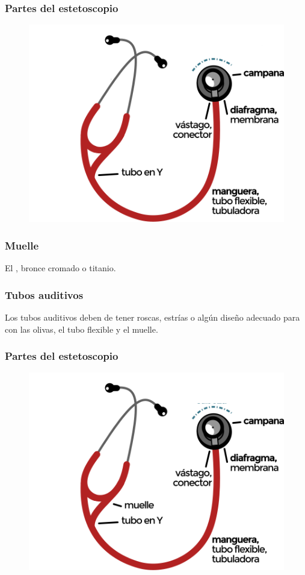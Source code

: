 \documentclass[14pt]{beamer}
\begin{document}
\begin{frame}
\frametitle{Partes del estetoscopio}
\vspace*{-1cm}
\begin{figure}
    \centering
    \includegraphics[scale=0.7]{Imagenes/Estetoscopio_04.png}
\end{figure}
\end{frame}
\begin{frame}
\frametitle{Muelle}
El , bronce cromado o titanio.
\end{frame}
\begin{frame}
\frametitle{Tubos auditivos}
Los tubos auditivos deben de tener roscas, estrías o algún diseño adecuado para  con las olivas, el tubo flexible y el muelle.
\end{frame}
\begin{frame}
\frametitle{Partes del estetoscopio}
\vspace*{-1cm}
\begin{figure}
    \centering
    \includegraphics[scale=0.7]{Imagenes/Estetoscopio_05.png}
\end{figure}
\end{frame}
\end{document}
